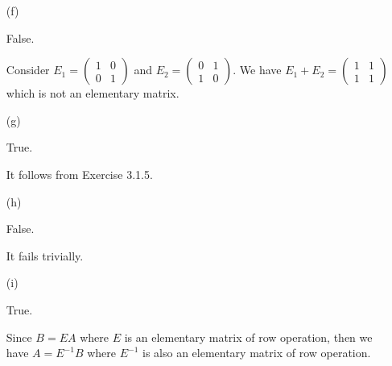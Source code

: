 \begin{Exercise}
\begin{enumerate}[(a)]
		\item[(f)]
		\begin{answer}
			False.
		\end{answer}
		\begin{solution}
			Consider $E_1 = \begin{pmatrix}
			1 & 0 \\
			0 & 1
			\end{pmatrix}$ and $E_2 = \begin{pmatrix}
			0 & 1 \\
			1 & 0
			\end{pmatrix}$. We have $E_1 + E_2 = \begin{pmatrix}
			1 & 1 \\
			1 & 1
			\end{pmatrix}$ which is not an elementary matrix.
		\end{solution}
		
		\item[(g)]
		\begin{answer}
			True.
		\end{answer}
		\begin{solution}
			It follows from Exercise 3.1.5.
		\end{solution}
		
		\item[(h)]
		\begin{answer}
			False.
		\end{answer}
		\begin{solution}
			It fails trivially.
		\end{solution}
		
		\item[(i)]
		\begin{answer}
			True.
		\end{answer}
		\begin{solution}
			Since $B=EA$ where $E$ is an elementary matrix of row operation, then we have $A = E^{-1}B$ where $E^{-1}$ is also an elementary matrix of row operation.
		\end{solution}
		
	\end{enumerate}
\end{Exercise}